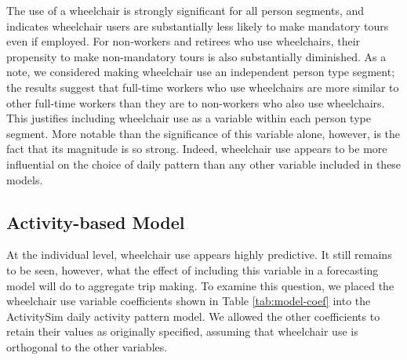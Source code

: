 \documentclass[3p, authoryear, review]{elsarticle} %
\begin{document}
The use of a wheelchair is strongly significant for all person segments, and
indicates wheelchair users are substantially less likely to make mandatory tours
even if employed. For non-workers and retirees who use wheelchairs, their propensity
to make non-mandatory tours is also substantially diminished. As a note, we considered
making wheelchair use an independent person type segment; the results suggest that
full-time workers who use wheelchairs are more similar to other full-time workers
than they are to non-workers who also use wheelchairs. This justifies including
wheelchair use as a variable within each person type segment. More notable than
the significance of this variable alone, however, is the fact that its magnitude
is so strong. Indeed, wheelchair use appears to be more influential on the choice
of daily pattern than any other variable included in these models.

\hypertarget{activity-based-model}{%
\subsection{Activity-based Model}\label{activity-based-model}}

At the individual level, wheelchair use appears highly predictive. It still remains
to be seen, however, what the effect of including this variable in a forecasting
model will do to aggregate trip making. To examine this question, we placed the
wheelchair use variable coefficients shown in Table \ref{tab:model-coef} into
the ActivitySim daily activity pattern model. We allowed the other coefficients
to retain their values as originally specified, assuming that wheelchair use
is orthogonal to the other variables.
\end{document}
